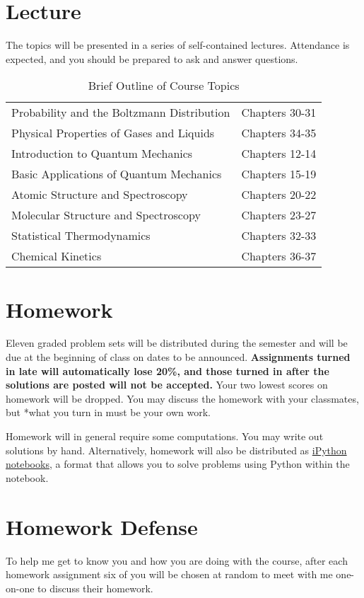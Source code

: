 \documentclass[11pt]{article}
\begin{document}
\section{Lecture}
\label{sec:org5cdd3f5}
The topics will be presented in a series of self-contained
lectures. Attendance is expected, and you should be prepared to ask
and answer questions.  

\begin{table}[htbp]
\caption{Brief Outline of Course Topics}
\centering
\begin{tabular}{ll}
\hline
Probability and the Boltzmann Distribution & Chapters 30-31\\
Physical Properties of Gases and Liquids & Chapters 34-35\\
Introduction to Quantum Mechanics & Chapters 12-14\\
Basic Applications of Quantum Mechanics & Chapters 15-19\\
Atomic Structure and Spectroscopy & Chapters 20-22\\
Molecular Structure and Spectroscopy & Chapters 23-27\\
Statistical Thermodynamics & Chapters 32-33\\
Chemical Kinetics & Chapters 36-37\\
\hline
\end{tabular}
\end{table}

\section{Homework}
\label{sec:org66f6cc3}
Eleven graded problem sets will be distributed during the semester and will be due at the beginning of class on dates to be announced.  \textbf{Assignments turned in late will automatically lose 20\%, and those turned in after the solutions are posted will not be accepted.}  Your two lowest scores on homework will be dropped.  You may discuss the homework with your classmates, but *what you turn in must be your own work.

Homework will in general require some computations. You may write out solutions by hand. Alternatively, homework will also be distributed as \href{https://ipython.org/notebook.html}{iPython notebooks}, a format that allows you to solve problems using Python within the notebook.
\section{Homework Defense}
\label{sec:org62e12c8}
To help me get to know you and how you are doing with the course, after each homework assignment six of you will be chosen at random to meet with me one-on-one to discuss their homework.
\end{document}
